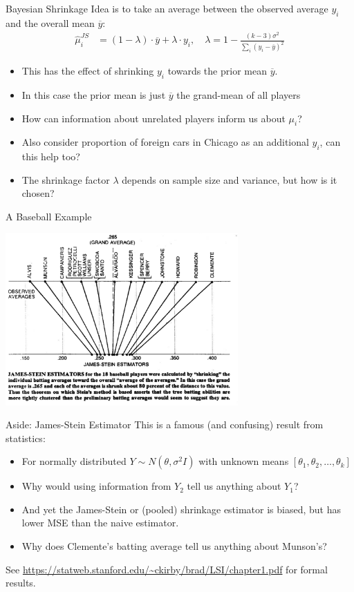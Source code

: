 \documentclass[xcolor=pdftex,dvipsnames,table,mathserif,aspectratio=169]{beamer}
\begin{document}
\begin{frame}[fragile]{Bayesian Shrinkage}
Idea is to take an average between the observed average $y_i$ and the overall mean $\overline{y}$:
\begin{align*}
\widehat{\mu}_i^{JS} &=  (1-\lambda) \cdot \overline{y}  + \lambda \cdot y_i, \quad
\lambda = 1 - \frac{(k-3) \sigma^2}{\sum_i( y_i - \overline{y})^2}
\end{align*}
\begin{itemize}
\item This has the effect of \alert{shrinking} $y_i$ towards the \alert{prior mean} $\overline{y}$.
\item In this case the \alert{prior mean} is just $\overline{y}$ the grand-mean of all players
\item How can information about unrelated players inform us about $\mu_i$?
\item Also consider proportion of foreign cars in Chicago as an additional $y_i$, can this help too?
\item The \alert{shrinkage factor} $\lambda$ depends on sample size and variance, but how is it chosen?
\end{itemize}
\end{frame}



\begin{frame}[fragile]{A Baseball Example}
\begin{center}
\includegraphics[width=3.5in]{./resources/baseball2.png}
\end{center}
\end{frame}

\begin{frame}{Aside: James-Stein Estimator}
This is a famous (and confusing) result from statistics:
\begin{itemize}
\item For normally distributed $Y \sim N(\theta,\sigma^2 I)$ with unknown means $[\theta_1,\theta_2,\ldots,\theta_k]$
\item Why would using information from $Y_2$ tell us anything about $Y_1$?
\item And yet the James-Stein or (pooled) shrinkage estimator is biased, but has lower MSE than the naive estimator.
\item Why does Clemente's batting average tell us anything about Munson's?
\end{itemize}
See \url{https://statweb.stanford.edu/~ckirby/brad/LSI/chapter1.pdf} for formal results.
\end{frame}
\end{document}
